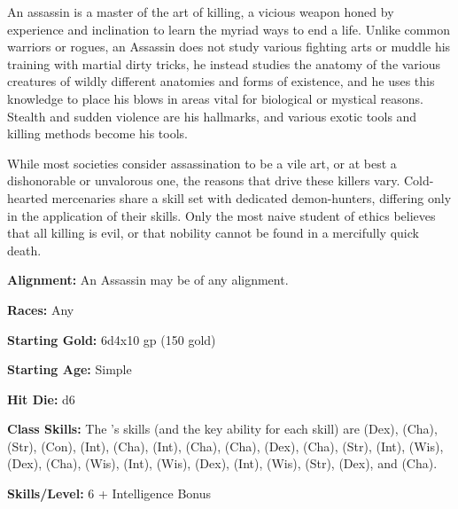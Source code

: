 
An assassin is a master of the art of killing, a vicious weapon honed by experience and inclination to learn the myriad ways to end a life. Unlike common warriors or rogues, an Assassin does not study various fighting arts or muddle his training with martial dirty tricks, he instead studies the anatomy of the various creatures of wildly different anatomies and forms of existence, and he uses this knowledge to place his blows in areas vital for biological or mystical reasons. Stealth and sudden violence are his hallmarks, and various exotic tools and killing methods become his tools.

While most societies consider assassination to be a vile art, or at best a dishonorable or unvalorous one, the reasons that drive these killers vary. Cold-hearted mercenaries share a skill set with dedicated demon-hunters, differing only in the application of their skills. Only the most naive student of ethics believes that all killing is evil, or that nobility cannot be found in a mercifully quick death.

\textbf{Alignment:} An Assassin may be of any alignment.

\textbf{Races:} Any

\textbf{Starting Gold:} 6d4x10 gp (150 gold)

\textbf{Starting Age:} Simple

\textbf{Hit Die:} d6

\textbf{Class Skills:} The \currentclassname{}'s skills (and the key ability for each skill) are  (Dex),  (Cha),  (Str),  (Con),  (Int),  (Cha),  (Int),  (Cha),  (Cha),  (Dex),  (Cha),  (Str),  (Int),  (Wis),  (Dex),  (Cha),  (Wis),  (Int),  (Wis),  (Dex),  (Int),  (Wis),  (Str),  (Dex), and  (Cha).

\textbf{Skills/Level:} 6 + Intelligence Bonus

\modebab{}
\goodfor{}
\poorref{}
\poorwil{}

